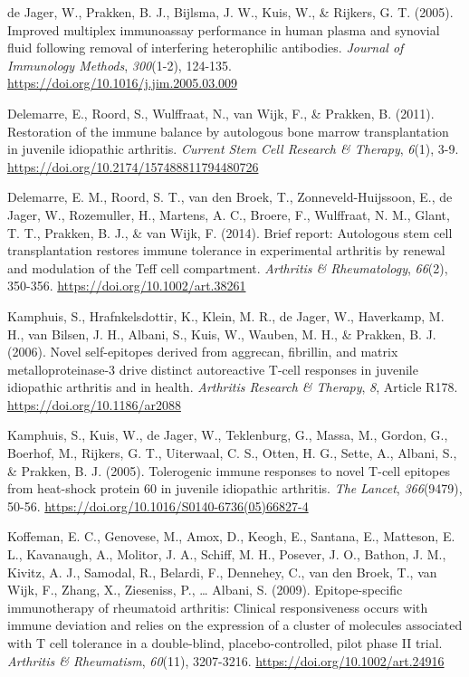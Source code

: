 \documentclass[authordate, editorial]{jote-new-article}
\begin{document}
	de Jager, W., Prakken, B. J., Bijlsma, J. W., Kuis, W., \& Rijkers, G. T. (2005). Improved multiplex immunoassay performance in human plasma and synovial fluid following removal of interfering heterophilic antibodies. \emph{Journal of Immunology Methods},\emph{ 300}(1-2), 124-135. \url{https://doi.org/10.1016/j.jim.2005.03.009}



	Delemarre, E., Roord, S., Wulffraat, N., van Wijk, F., \& Prakken, B. (2011). Restoration of the immune balance by autologous bone marrow transplantation in juvenile idiopathic arthritis. \emph{Current Stem Cell Research \& Therapy},\emph{ 6}(1), 3-9. \url{https://doi.org/10.2174/157488811794480726}



	Delemarre, E. M., Roord, S. T., van den Broek, T., Zonneveld-Huijssoon, E., de Jager, W., Rozemuller, H., Martens, A. C., Broere, F., Wulffraat, N. M., Glant, T. T., Prakken, B. J., \& van Wijk, F. (2014). Brief report: Autologous stem cell transplantation restores immune tolerance in experimental arthritis by renewal and modulation of the Teff cell compartment. \emph{Arthritis \& Rheumatology},\emph{ 66}(2), 350-356. \url{https://doi.org/10.1002/art.38261}



	Kamphuis, S., Hrafnkelsdottir, K., Klein, M. R., de Jager, W., Haverkamp, M. H., van Bilsen, J. H., Albani, S., Kuis, W., Wauben, M. H., \& Prakken, B. J. (2006). Novel self-epitopes derived from aggrecan, fibrillin, and matrix metalloproteinase-3 drive distinct autoreactive T-cell responses in juvenile idiopathic arthritis and in health. \emph{Arthritis Research \& Therapy},\emph{ 8}, Article R178. \url{https://doi.org/10.1186/ar2088}



	Kamphuis, S., Kuis, W., de Jager, W., Teklenburg, G., Massa, M., Gordon, G., Boerhof, M., Rijkers, G. T., Uiterwaal, C. S., Otten, H. G., Sette, A., Albani, S., \& Prakken, B. J. (2005). Tolerogenic immune responses to novel T-cell epitopes from heat-shock protein 60 in juvenile idiopathic arthritis. \emph{The} \emph{Lancet},\emph{ 366}(9479), 50-56. \url{https://doi.org/10.1016/S0140-6736(05)66827-4}



	Koffeman, E. C., Genovese, M., Amox, D., Keogh, E., Santana, E., Matteson, E. L., Kavanaugh, A., Molitor, J. A., Schiff, M. H., Posever, J. O., Bathon, J. M., Kivitz, A. J., Samodal, R., Belardi, F., Dennehey, C., van den Broek, T., van Wijk, F., Zhang, X., Zieseniss, P., … Albani, S. (2009). Epitope-specific immunotherapy of rheumatoid arthritis: Clinical responsiveness occurs with immune deviation and relies on the expression of a cluster of molecules associated with T cell tolerance in a double-blind, placebo-controlled, pilot phase II trial. \emph{Arthritis \& Rheumatism},\emph{ 60}(11), 3207-3216. \url{https://doi.org/10.1002/art.24916}
\end{document}
